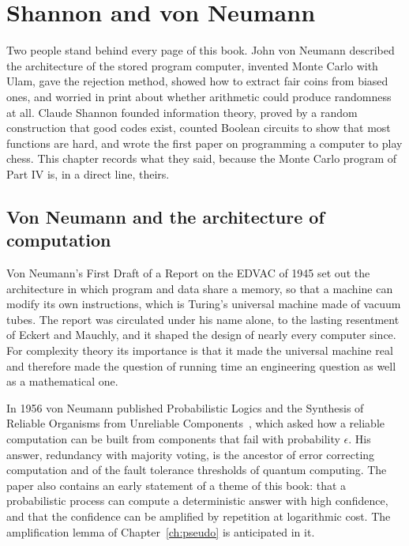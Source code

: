\chapter{Shannon and von Neumann}
\label{ch:shannon}

Two people stand behind every page of this book. John von Neumann described the architecture of the stored program computer, invented Monte Carlo with Ulam, gave the rejection method, showed how to extract fair coins from biased ones, and worried in print about whether arithmetic could produce randomness at all. Claude Shannon founded information theory, proved by a random construction that good codes exist, counted Boolean circuits to show that most functions are hard, and wrote the first paper on programming a computer to play chess. This chapter records what they said, because the Monte Carlo program of Part IV is, in a direct line, theirs.

\section{Von Neumann and the architecture of computation}

Von Neumann's First Draft of a Report on the EDVAC of 1945 set out the architecture in which program and data share a memory, so that a machine can modify its own instructions, which is Turing's universal machine made of vacuum tubes. The report was circulated under his name alone, to the lasting resentment of Eckert and Mauchly, and it shaped the design of nearly every computer since. For complexity theory its importance is that it made the universal machine real and therefore made the question of running time an engineering question as well as a mathematical one.

In 1956 von Neumann published Probabilistic Logics and the Synthesis of Reliable Organisms from Unreliable Components~\cite{vonNeumann56}, which asked how a reliable computation can be built from components that fail with probability $\epsilon$. His answer, redundancy with majority voting, is the ancestor of error correcting computation and of the fault tolerance thresholds of quantum computing. The paper also contains an early statement of a theme of this book: that a probabilistic process can compute a deterministic answer with high confidence, and that the confidence can be amplified by repetition at logarithmic cost. The amplification lemma of Chapter~\ref{ch:pseudo} is anticipated in it.

